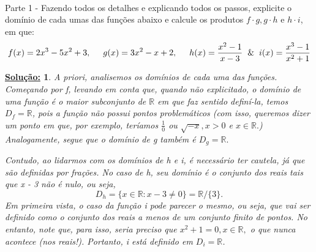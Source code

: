 \documentclass{article}
\newtheorem*{sol*}{\underline{Solu\c c\~ao:}}
\begin{document}
\paragraph{}Parte 1 - Fazendo todos os detalhes e explicando todos os passos, explicite o dom\'inio de cada umas das fun\c c\~oes abaixo e calcule os produtos $f\cdot{}g, g\cdot{}h \text{ e } h\cdot{}i$, em que:
$$
f(x) = 2x^3 - 5x^2 + 3, \hspace{0.5cm}
g(x) = 3x^2 - x + 2, \hspace{0.5cm}
h(x) = \frac{x^2 - 1}{x - 3} \hspace{0.2cm} \text{\&} \hspace{0.2cm}   
i(x) = \frac{x^3 - 1}{x^2 + 1}
$$
\begin{sol*}
A priori, analisemos os dom\'inios de cada uma das fun\c c\~oes. Come\c cando por f, levando em conta que, quando n\~ao explicitado, o dom\'inio de uma fun\c c\~ao \'e o maior subconjunto de $\mathbb{R}$ em que faz sentido defin\'i-la, temos $D_f = \mathbb{R}$, pois a fun\c c\~ao n\~ao possui pontos problem\'aticos (com isso, queremos dizer um ponto em que, por exemplo, ter\'iamos $\frac{1}{0}$ ou $\sqrt{-x}, x > 0$ e $x\in\mathbb{R}.$) Analogamente, segue que o dom\'inio de g tamb\'em \'e $D_g = \mathbb{R}.$ 

Contudo, ao lidarmos com os dom\'inios de h e i, \'e necess\'ario ter cautela, j\'a que s\~ao definidas por fra\c c\~oes. No caso de h, seu dom\'inio \'e o conjunto dos reais tais que x - 3 n\~ao \'e nulo, ou seja, 
$$
D_h = \{x\in\mathbb{R}: x - 3 \neq 0\} = \mathbb{R}/\{3\}.
$$
Em primeira vista, o caso da fun\c c\~ao i pode parecer o mesmo, ou seja, que vai ser definido como o conjunto dos reais a menos de um conjunto finito de pontos. No entanto, note que, para isso, seria preciso que $x^2 + 1 = 0, x\in\mathbb{R},$ o que nunca acontece (nos reais!). Portanto, i est\'a definido em $D_{i} = \mathbb{R}$.


\end{sol*}
\end{document}
